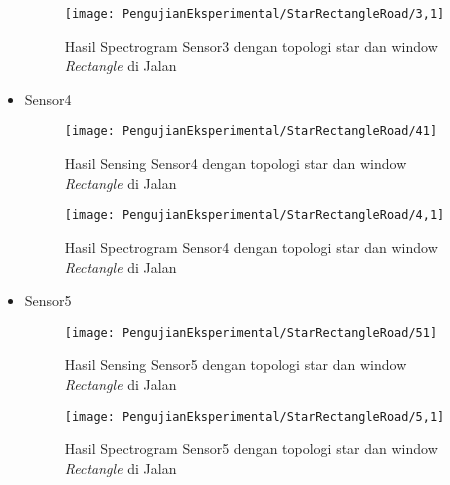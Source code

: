 \begin{itemize}
\begin{figure}[H]
	\centering
	\texttt{[image: PengujianEksperimental/StarRectangleRoad/3,1]}
	\caption[Hasil Spectrogram Sensor3 dengan topologi star dan window {\it Rectangle} di Jalan]{Hasil Spectrogram Sensor3 dengan topologi star dan window {\it Rectangle} di Jalan} 
	\label{fig:hasilJalanStarRect3,1}
\end{figure}

\item Sensor4
\begin{figure}[H]
	\centering
	\texttt{[image: PengujianEksperimental/StarRectangleRoad/41]}
	\caption[Hasil Sensing Sensor4 dengan topologi star dan window {\it Rectangle} di Jalan]{Hasil Sensing Sensor4 dengan topologi star dan window {\it Rectangle} di Jalan} 
	\label{fig:hasilJalanStarRect41}
\end{figure}

\begin{figure}[H]
	\centering
	\texttt{[image: PengujianEksperimental/StarRectangleRoad/4,1]}
	\caption[Hasil Spectrogram Sensor4 dengan topologi star dan window {\it Rectangle} di Jalan]{Hasil Spectrogram Sensor4 dengan topologi star dan window {\it Rectangle} di Jalan} 
	\label{fig:hasilJalanStarRect4,1}
\end{figure}

\item Sensor5
\begin{figure}[H]
	\centering
	\texttt{[image: PengujianEksperimental/StarRectangleRoad/51]}
	\caption[Hasil Sensing Sensor5 dengan topologi star dan window {\it Rectangle} di Jalan]{Hasil Sensing Sensor5 dengan topologi star dan window {\it Rectangle} di Jalan} 
	\label{fig:hasilJalanStarRect51}
\end{figure}

\begin{figure}[H]
	\centering
	\texttt{[image: PengujianEksperimental/StarRectangleRoad/5,1]}
	\caption[Hasil Spectrogram Sensor5 dengan topologi star dan window {\it Rectangle} di Jalan]{Hasil Spectrogram Sensor5 dengan topologi star dan window {\it Rectangle} di Jalan} 
	\label{fig:hasilJalanStarRect5,1}
\end{figure}
\end{itemize}

